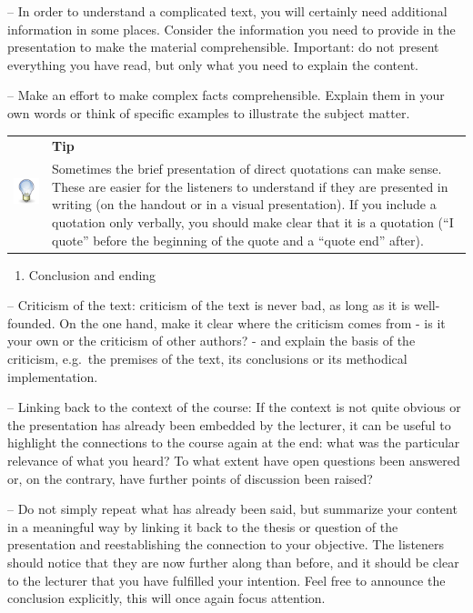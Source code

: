 \documentclass[
  english,
]{scrreprt}
\providecommand{\tightlist}{%
  \setlength{\itemsep}{0pt}\setlength{\parskip}{0pt}}
\newlength{\iconwidth}
\newenvironment{displaybox}[2]{%
    \begin{center}
        \setlength\arrayrulewidth{0.75pt}%
        \arrayrulecolor{white}%
        \renewcommand{\arraystretch}{1.3}%
        \begin{tabular}{p{\iconwidth}p{\linewidth-4\tabcolsep-\iconwidth}}
            \multirow{2}{*}{#2}&\cellcolor{boxheadcol}\textbf{\sffamily\color{white}#1} \\%
            \hhline{~-}%
            &\cellcolor{boxcol}%
}{%
            \\
        \end{tabular}
        \arrayrulecolor{black}
    \end{center}
}
\newenvironment{Tip}{%
\begin{displaybox}{Tip}{\includegraphics[width=\iconwidth]{images/icon-tipp}}}%
{\end{displaybox}}
\begin{document}
– In order to understand a complicated text, you will certainly need additional information in some places. Consider the information you need to provide in the presentation to make the material comprehensible. Important: do not present everything you have read, but only what you need to explain the content.

– Make an effort to make complex facts comprehensible. Explain them in your own words or think of specific examples to illustrate the subject matter.

\begin{Tip}

Sometimes the brief presentation of direct quotations can make sense. These are easier for the listeners to understand if they are presented in writing (on the handout or in a visual presentation). If you include a quotation only verbally, you should make clear that it is a quotation (“I quote” before the beginning of the quote and a “quote end” after).

\end{Tip}

\begin{enumerate}
\def\labelenumi{\arabic{enumi}.}
\setcounter{enumi}{2}
\tightlist
\item
  Conclusion and ending
\end{enumerate}

– Criticism of the text: criticism of the text is never bad, as long as it is well-founded. On the one hand, make it clear where the criticism comes from - is it your own or the criticism of other authors? - and explain the basis of the criticism, e.g.~the premises of the text, its conclusions or its methodical implementation.

– Linking back to the context of the course: If the context is not quite obvious or the presentation has already been embedded by the lecturer, it can be useful to highlight the connections to the course again at the end: what was the particular relevance of what you heard? To what extent have open questions been answered or, on the contrary, have further points of discussion been raised?

– Do not simply repeat what has already been said, but summarize your content in a meaningful way by linking it back to the thesis or question of the presentation and reestablishing the connection to your objective. The listeners should notice that they are now further along than before, and it should be clear to the lecturer that you have fulfilled your intention. Feel free to announce the conclusion explicitly, this will once again focus attention.
\end{document}
